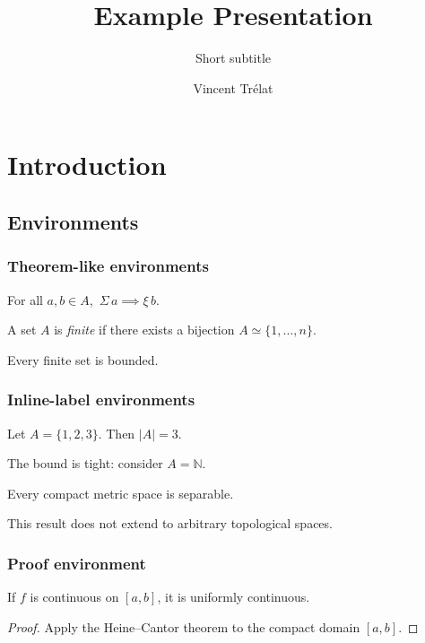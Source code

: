 \documentclass[aspectratio=169, noamssymb]{beamer}
\title{Example Presentation}
\subtitle{Short subtitle}
\author{Vincent Trélat}
\institute{Université de Lorraine, CNRS, Inria, Loria, Nancy, France}
\begin{document}
\begin{frame}
  \maketitle
\end{frame}

\begin{frame}
  \tableofcontents
\end{frame}

\section{Introduction}

\subsection{Environments}

\begin{frame}
  \frametitle{Theorem-like environments}
  \begin{theorem}
    For all $a, b \in A$,\ $\Sigma\, a \implies \xi\, b$.
  \end{theorem}
  \begin{definition}
    A set $A$ is \emph{finite} if there exists a bijection $A \simeq \{1,\dots,n\}$.
  \end{definition}
  \begin{corollary}
    Every finite set is bounded.
  \end{corollary}
\end{frame}

\begin{frame}
  \frametitle{Inline-label environments}
  \begin{example}
    Let $A = \{1, 2, 3\}$.  Then $|A| = 3$.
  \end{example}
  \begin{remark}
    The bound is tight: consider $A = \mathbb{N}$.
  \end{remark}
  \begin{fact}
    Every compact metric space is separable.
  \end{fact}
  \begin{note}
    This result does not extend to arbitrary topological spaces.
  \end{note}
\end{frame}

\begin{frame}
  \frametitle{Proof environment}
  \begin{lemma}
    If $f$ is continuous on $[a,b]$, it is uniformly continuous.
  \end{lemma}
  \begin{proof}
    Apply the Heine--Cantor theorem to the compact domain $[a,b]$.
  \end{proof}
\end{frame}
\end{document}
